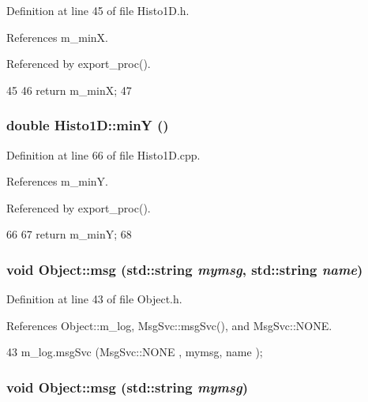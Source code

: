 Definition at line 45 of file Histo1D.h.

References m\_\-minX.

Referenced by export\_\-proc().


\begin{DoxyCode}
45                { 
46     return m_minX; 
47   }
\end{DoxyCode}
\hypertarget{classHisto1D_a122c7071e060672dd2c08ad92212b3a2}{
\subsubsection[{minY}]{\setlength{\rightskip}{0pt plus 5cm}double Histo1D::minY ()}}
\label{classHisto1D_a122c7071e060672dd2c08ad92212b3a2}


Definition at line 66 of file Histo1D.cpp.

References m\_\-minY.

Referenced by export\_\-proc().


\begin{DoxyCode}
66                     {
67     return m_minY;
68 }
\end{DoxyCode}
\hypertarget{classObject_ac5d59299273cee27aacf7de00d2e7034}{
\subsubsection[{msg}]{\setlength{\rightskip}{0pt plus 5cm}void Object::msg (std::string {\em mymsg}, \/  std::string {\em name})}}
\label{classObject_ac5d59299273cee27aacf7de00d2e7034}


Definition at line 43 of file Object.h.

References Object::m\_\-log, MsgSvc::msgSvc(), and MsgSvc::NONE.


\begin{DoxyCode}
43 { m_log.msgSvc (MsgSvc::NONE    , mymsg, name ); }
\end{DoxyCode}
\hypertarget{classObject_a58b2d0618c2d08cf2383012611528d97}{
\subsubsection[{msg}]{\setlength{\rightskip}{0pt plus 5cm}void Object::msg (std::string {\em mymsg})}}
\label{classObject_a58b2d0618c2d08cf2383012611528d97}


